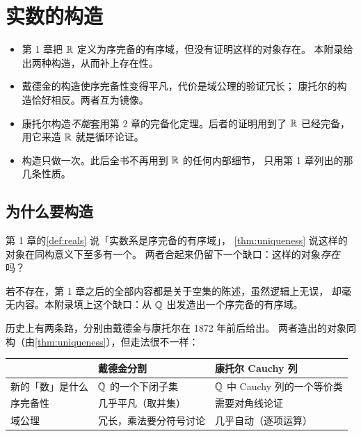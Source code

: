 \chapter{实数的构造}
\label{app:construction}

\begin{keypoint}[本附录要点]
  \begin{itemize}
    \item 第 1 章把 \(\mathbb{R}\) 定义为序完备的有序域，但没有证明这样的对象存在。
          本附录给出两种构造，从而补上存在性。
    \item 戴德金的构造使序完备性变得平凡，代价是域公理的验证冗长；
          康托尔的构造恰好相反。两者互为镜像。
    \item 康托尔构造\emph{不能}套用第 2 章的完备化定理。后者的证明用到了
          \(\mathbb{R}\) 已经完备，用它来造 \(\mathbb{R}\) 就是循环论证。
    \item 构造只做一次。此后全书不再用到 \(\mathbb{R}\) 的任何内部细节，
          只用第 1 章列出的那几条性质。
  \end{itemize}
\end{keypoint}

\section{为什么要构造}
\label{sec:why-construct}

第 1 章的\cref{def:reals} 说「实数系是序完备的有序域」，
\cref{thm:uniqueness} 说这样的对象在同构意义下至多有一个。
两者合起来仍留下一个缺口：这样的对象\emph{存在}吗？

若不存在，第 1 章之后的全部内容都是关于空集的陈述，虽然逻辑上无误，
却毫无内容。本附录填上这个缺口：从 \(\mathbb{Q}\) 出发造出一个序完备的有序域。

历史上有两条路，分别由戴德金与康托尔在 1872 年前后给出。
两者造出的对象同构（由\cref{thm:uniqueness}），但走法很不一样：

\begin{center}
\begin{tabular}{@{}lll@{}}
  \toprule
  & 戴德金分割 & 康托尔 Cauchy 列 \\
  \midrule
  新的「数」是什么 & \(\mathbb{Q}\) 的一个下闭子集 & \(\mathbb{Q}\) 中 Cauchy 列的一个等价类 \\
  序完备性 & 几乎平凡（取并集） & 需要对角线论证 \\
  域公理 & 冗长，乘法要分符号讨论 & 几乎自动（逐项运算） \\
  \bottomrule
\end{tabular}
\end{center}

